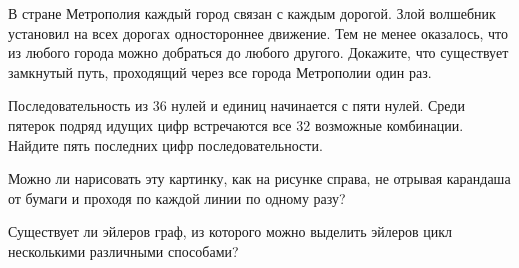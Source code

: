 \begin{exersize}
	В стране Метрополия каждый город связан с каждым дорогой. Злой волшебник установил на всех дорогах одностороннее движение. Тем не менее оказалось, что из любого города можно добраться до любого другого. Докажите, что существует замкнутый путь, проходящий через все города Метрополии один раз.
\end{exersize}

\begin{exersize}
	Последовательность из $36$ нулей и единиц начинается с пяти нулей. Среди пятерок подряд идущих цифр встречаются все $32$ возможные комбинации. Найдите пять последних цифр последовательности.	
\end{exersize}

\begin{exersize}
	Можно ли нарисовать эту картинку, как на рисунке справа, не отрывая карандаша от бумаги и проходя по каждой линии по одному разу?
	
\end{exersize}

\begin{exersize}
	Существует ли эйлеров граф, из которого можно выделить эйлеров цикл несколькими различными способами?
\end{exersize}
